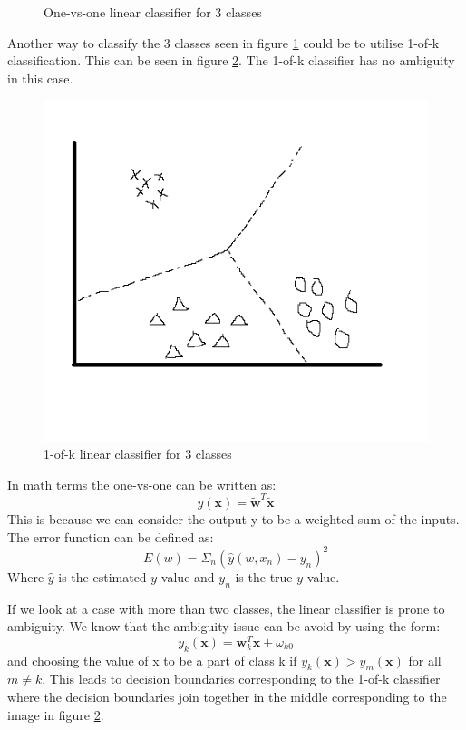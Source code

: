\begin{figure}[H]
\begin{minipage}[b]{0.5\textwidth}
\caption{One-vs-one linear classifier for 3 classes}
\label{onevsone2}
\end{minipage}
\end{figure}
Another way to classify  the 3 classes seen in figure \ref{onevsone2} could be to utilise 1-of-k classification. This can be seen in figure \ref{oneofk1}. The 1-of-k classifier  has no ambiguity in this case.
\begin{figure}[H]
\centering
\includegraphics[scale=0.5]{billeder/oneofk1}
\caption{1-of-k linear classifier for 3 classes}
\label{oneofk1}
\end{figure}
In math terms the one-vs-one can be written as:
\begin{equation}
\label{oneofkcostfunc}
y(\textbf{x})=\tilde{\textbf{w}}^T\tilde{\textbf{x}}
\end{equation}
This is because we can consider the output y to be a weighted sum of the inputs. The error function can be defined as:
\begin{equation}
E(w) = \Sigma_n (\hat{y}(w,x_n) - y_n)^2
\end{equation}
Where $\hat{y}$ is the estimated $y$ value and $y_n$ is the true $y$ value.

If we look at a case with more than two classes, the linear classifier is prone to ambiguity. We know that the ambiguity issue can be avoid by using the form:
\begin{equation}
y_k(\textbf{x})=\textbf{w}_k^T\textbf{x}+\omega_{k0}
\end{equation}
and choosing the value of x to be a part of class k if $y_k(\textbf{x})>y_{m}(\textbf{x})$ for all $m \neq k$. This leads to decision boundaries corresponding to the 1-of-k classifier where the decision boundaries join together in the middle corresponding to the image in figure \ref{oneofk1}.


